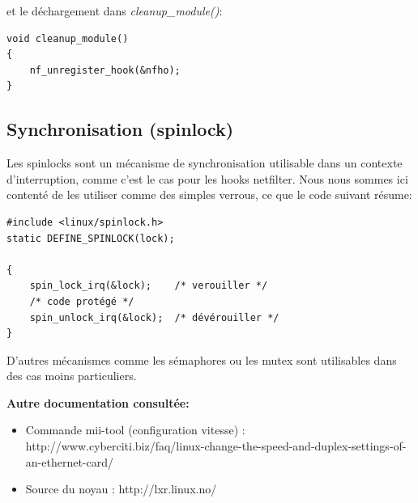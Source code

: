 \documentclass[a4paper]{article}
\begin{document}
et le déchargement dans \textit{cleanup\_module()}:
\begin{verbatim}
void cleanup_module()
{
    nf_unregister_hook(&nfho);
}
\end{verbatim}

\subsection{Synchronisation (spinlock)}
Les spinlocks sont un mécanisme de synchronisation utilisable
dans un contexte d'interruption, comme c'est le cas pour les
hooks netfilter. Nous nous sommes ici contenté de les utiliser
comme des simples verrous, ce que le code suivant résume:

\begin{verbatim}
#include <linux/spinlock.h>
static DEFINE_SPINLOCK(lock); 

{
    spin_lock_irq(&lock);    /* verouiller */
    /* code protégé */
    spin_unlock_irq(&lock);  /* dévérouiller */
}
\end{verbatim}

D'autres mécanismes comme les sémaphores ou les mutex sont
utilisables dans des cas moins particuliers.

\newpage



\textbf{Autre documentation consultée:}
\begin{itemize}
	\item Commande mii-tool (configuration vitesse) : 
	http://www.cyberciti.biz/faq/linux-change-the-speed-and-duplex-settings-of-an-ethernet-card/
	\item Source du noyau : http://lxr.linux.no/
\end{itemize}
\end{document}
